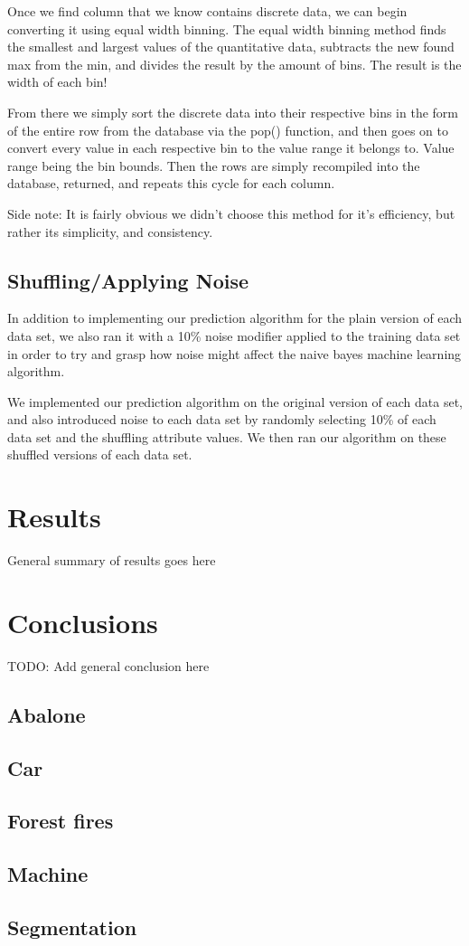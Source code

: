 \documentclass[twoside,11pt]{article}
\begin{document}
Once we find  column that we know contains discrete data, we can begin converting it using equal width binning. The equal width binning method finds the smallest and largest values of the quantitative data, subtracts the new found max from the min, and divides the result by the amount of bins. The result is the width of each bin!

From there we simply sort the discrete data into their respective bins in the form of the entire row from the database via the pop() function, and then goes on to convert every value in each respective bin to the value range it belongs to. Value range being the bin bounds. Then the rows are simply recompiled into the database, returned, and repeats this cycle for each column.

Side note: It is fairly obvious we didn't choose this method for it’s efficiency, but rather its simplicity, and consistency.

\subsection{Shuffling/Applying Noise}

In addition to implementing our prediction algorithm for the plain version of each data set, we also ran it with a 10\% noise modifier applied to the training data set in order to try and grasp how noise might affect the naive bayes machine learning algorithm. 

We implemented our prediction algorithm on the original version of each data set, and also introduced noise to each data set by randomly selecting 10\% of each data set and the shuffling attribute values. We then ran our algorithm on these shuffled versions of each data set.

\section{Results}
General summary of results goes here

\section{Conclusions}

TODO: Add general conclusion here

\subsection{Abalone}

\subsection{Car}

\subsection{Forest fires}

\subsection{Machine}

\subsection{Segmentation}


\acks{}
\end{document}
